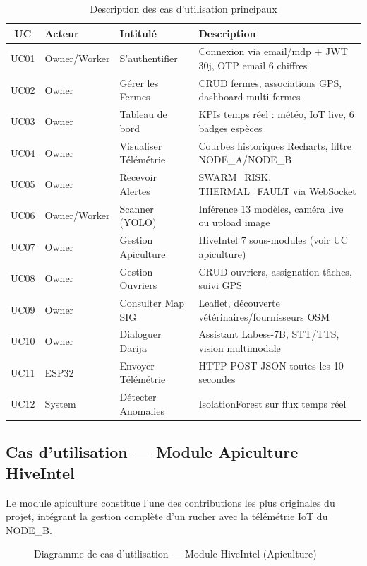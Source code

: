 \begin{table}[H]
\centering
\caption{Description des cas d'utilisation principaux}
\label{tab:uc_desc}
\small
\begin{tabular}{cllp{5cm}}
\toprule
\textbf{UC} & \textbf{Acteur} & \textbf{Intitulé} & \textbf{Description} \\
\midrule
UC01 & Owner/Worker & S'authentifier &
  Connexion via email/mdp + JWT 30j, OTP email 6 chiffres \\
UC02 & Owner & Gérer les Fermes &
  CRUD fermes, associations GPS, dashboard multi-fermes \\
UC03 & Owner & Tableau de bord &
  KPIs temps réel : météo, IoT live, 6 badges espèces \\
UC04 & Owner & Visualiser Télémétrie &
  Courbes historiques Recharts, filtre NODE\_A/NODE\_B \\
UC05 & Owner & Recevoir Alertes &
  SWARM\_RISK, THERMAL\_FAULT via WebSocket \\
UC06 & Owner/Worker & Scanner (YOLO) &
  Inférence 13 modèles, caméra live ou upload image \\
UC07 & Owner & Gestion Apiculture &
  HiveIntel 7 sous-modules (voir UC apiculture) \\
UC08 & Owner & Gestion Ouvriers &
  CRUD ouvriers, assignation tâches, suivi GPS \\
UC09 & Owner & Consulter Map SIG &
  Leaflet, découverte vétérinaires/fournisseurs OSM \\
UC10 & Owner & Dialoguer Darija &
  Assistant Labess-7B, STT/TTS, vision multimodale \\
UC11 & ESP32 & Envoyer Télémétrie &
  HTTP POST JSON toutes les 10 secondes \\
UC12 & System & Détecter Anomalies &
  IsolationForest sur flux temps réel \\
\bottomrule
\end{tabular}
\end{table}

\subsection{Cas d'utilisation — Module Apiculture HiveIntel}

Le module apiculture constitue l'une des contributions les plus originales du projet,
intégrant la gestion complète d'un rucher avec la télémétrie IoT du NODE\_B.

\begin{figure}[H]
\centering
\resizebox{0.95\textwidth}{!}{%

}
\caption{Diagramme de cas d'utilisation — Module HiveIntel (Apiculture)}
\label{fig:uc_bee}
\end{figure}

